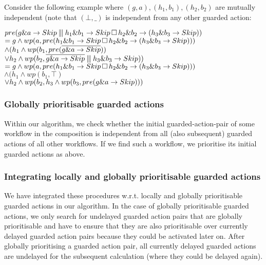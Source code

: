 \documentclass[11pt]{article}
\begin{document}
Consider the following example where $(g,a),(h_1,b_1),(h_2,b_2)$ are mutually independent (note that $(\bot,\_)$ is independent from any other guarded action:

\noindent
$pre(g \& a \rightarrow Skip \interleave h_1 \& b_1 \rightarrow Skip \, \Box \, h_2 \& b_2 \rightarrow (h_3 \& b_3 \rightarrow Skip))$ \\
$= g \land wp(a,pre(h_1 \& b_1 \rightarrow Skip \, \Box \, h_2 \& b_2 \rightarrow (h_3 \& b_3 \rightarrow Skip)))$ \\
$\land (h_1 \land wp(b_1,pre(\overline{g \& a \rightarrow Skip}))$ \\
\hspace*{10pt}$\lor h_2 \land wp(b_2,\overline{g \& a \rightarrow Skip} \interleave h_3 \& b_3 \rightarrow Skip))$ \\
$= g \land wp(a,pre(h_1 \& b_1 \rightarrow Skip \, \Box \, h_2 \& b_2 \rightarrow (h_3 \& b_3 \rightarrow Skip)))$ \\
$\land (h_1 \land wp(b_1,\top)$ \\
\hspace*{10pt}$\lor h_2 \land wp(b_2,h_3 \land wp(b_3,pre(g \& a \rightarrow Skip)))$

\subsubsection{Globally prioritisable guarded actions}

Within our algorithm, we check whether the initial guarded-action-pair of some workflow in the composition is independent from all (also subsequent) guarded actions of all other workflows. If we find such a workflow, we prioritise its initial guarded actions as above.

\subsubsection{Integrating locally and globally prioritisable guarded actions}

We have integrated these procedures w.r.t. locally and globally prioritisable guarded actions in our algorithm. In the case of globally prioritisable guarded actions, we only search for undelayed guarded action pairs that are globally prioritisable and have to ensure that they are also prioritisable over currently delayed guarded action pairs because they could be activated later on. After globally prioritising a guarded action pair, all currently delayed guarded actions are undelayed for the subsequent calculation (where they could be delayed again).
\end{document}
